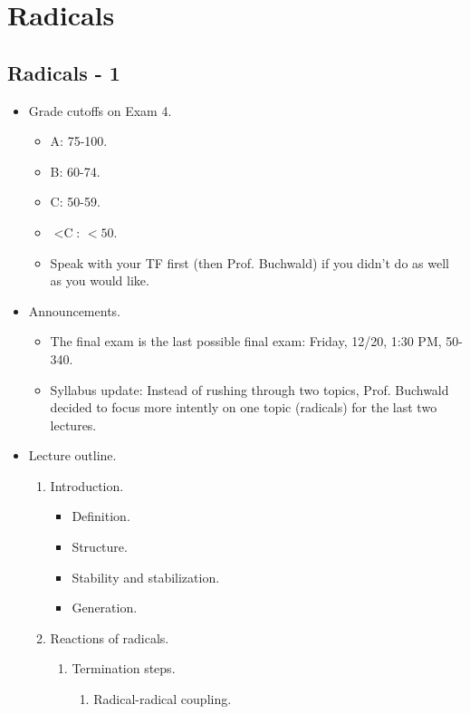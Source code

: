 \documentclass[../notes.tex]{subfiles}
\begin{document}
\chapter{Radicals}
\setcounter{section}{37}
\section{Radicals - 1}
\begin{itemize}
    \item {}Grade cutoffs on Exam 4.
    \begin{itemize}
        \item A: 75-100.
        \item B: 60-74.
        \item C: 50-59.
        \item $<\text{C}$: $<50$.
        \item Speak with your TF first (then Prof. Buchwald) if you didn't do as well as you would like.
    \end{itemize}
    \item Announcements.
    \begin{itemize}
        \item The final exam is the last possible final exam: Friday, 12/20, 1:30 PM, 50-340.
        \item Syllabus update: Instead of rushing through two topics, Prof. Buchwald decided to focus more intently on one topic (radicals) for the last two lectures.
    \end{itemize}
    \item Lecture outline.
    \begin{enumerate}[label={\Alph*.}]
        \item Introduction.
        \begin{itemize}
            \item Definition.
            \item Structure.
            \item Stability and stabilization.
            \item Generation.
        \end{itemize}
        \item Reactions of radicals.
        \begin{enumerate}[label={\arabic*)}]
            \item Termination steps.
            \begin{enumerate}[label={\alph*)}]
                \item Radical-radical coupling.

\end{enumerate}
\end{enumerate}
\end{enumerate}
\end{itemize}
\end{document}
